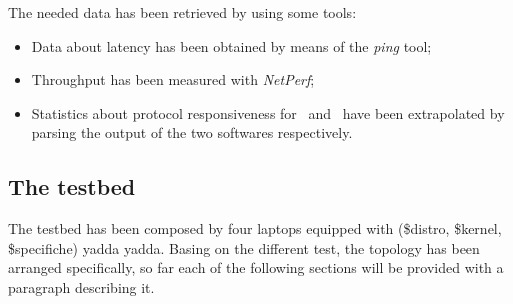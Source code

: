     The needed data has been retrieved by using some tools:
    \begin{itemize}
    \item   Data about latency has been obtained by means of the
            \emph{ping} tool;
    \item   Throughput has been measured with
            \emph{NetPerf}\cite{bib:NetPerf};
    \item   Statistics about protocol responsiveness for \batman\ and
            \olsr\ have been extrapolated by parsing the output of the
            two softwares respectively.
    \end{itemize}

\subsection{The testbed}

    The testbed has been composed by four laptops equipped with
    (\$distro, \$kernel, \$specifiche) yadda yadda. Basing on the
    different test, the topology has been arranged specifically, so
    far each of the following sections will be provided with a
    paragraph describing it.

